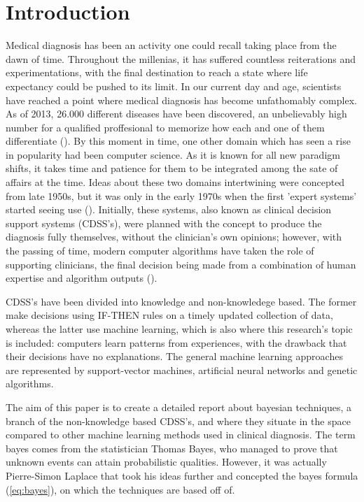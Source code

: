\documentclass[3p,times,procedia]{elsarticle}
\begin{document}

\section{Introduction}\label{introduction}
Medical diagnosis has been an activity one could recall taking place
from the dawn of time. Throughout the millenias, it has suffered countless
reiterations and experimentations, with the final destination to reach
a state where life expectancy could be pushed to its limit. 
In our current day and age, scientists have reached a point where medical
diagnosis has become unfathomably complex. As of 2013, 26.000 different
diseases have been discovered, an unbelievably high number for a qualified
proffesional to memorize how each and one of them differentiate (\cite{Espe2018Malacards}).
By this moment in time, one other domain which has seen a rise in popularity had been
computer science. As it is known for all new paradigm shifts, it takes time and
patience for them to be integrated among the sate of affairs at the time. 
Ideas about these two domains intertwining were concepted from late 1950s, but
it was only in the early 1970s when the first 'expert systems' started seeing use
(\cite{WikipediaCAD2024}). Initially, these systems, also  known as clinical
decision support systems (CDSS's), were planned with the concept to produce the diagnosis
fully themselves, without the clinician's own opinions; however, with the passing
of time, modern computer algorithms have taken the role of supporting clinicians,
the final decision being made from a combination of human expertise and algorithm
outputs (\cite{WikipediaCDSS2024}).

CDSS's have been divided into knowledge and non-knowledege based.
The former make decisions using IF-THEN rules on a timely
updated collection of data, whereas the latter use machine
learning, which is also where this research's topic is included:
computers learn patterns from experiences, with the
drawback that their decisions have no explanations. The general
machine learning approaches are represented by support-vector
machines, artificial neural networks and genetic algorithms.

The aim of this paper is to create a detailed report about
bayesian techniques, a branch of the non-knowledge based CDSS's,
and where they situate in the space compared to other machine learning
methods used in clinical diagnosis.
The term bayes comes from the statistician Thomas Bayes, who
managed to prove that unknown events can attain probabilistic
qualities. However, it was actually Pierre-Simon Laplace that 
took his ideas further and concepted the bayes formula (\ref{eq:bayes}),
on which the techniques are based off of.
\end{document}

